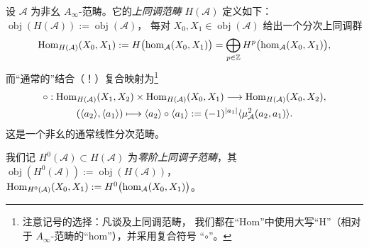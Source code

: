 \begin{Def}\label{def:2.6}
设 $\mathcal A$ 为非幺 $A_\infty$-范畴。它的\emph{上同调范畴} $H(\mathcal A)$
定义如下：$\operatorname{obj}(H(\mathcal A)):=\operatorname{obj}(\mathcal A)$，
每对 $X_0,X_1\in\operatorname{obj}(\mathcal A)$ 给出一个分次上同调群
\begin{equation}\label{eq:2.7}
  \operatorname{Hom}_{H(\mathcal A)}(X_0,X_1):=H\bigl(\hom_{\mathcal A}(X_0,X_1)\bigr)
  =\bigoplus_{p\in\mathbb Z}H^p\bigl(\hom_{\mathcal A}(X_0,X_1)\bigr),
\end{equation}
而“通常的”结合（！）复合映射为\footnote{注意记号的选择：凡谈及上同调范畴，
我们都在“Hom”中使用大写“H”（相对于 $A_\infty$-范畴的“hom”），并采用复合符号
“$\circ$”。}
\begin{equation}\label{eq:2.8}
  \begin{gathered}
    \circ:\operatorname{Hom}_{H(\mathcal A)}(X_1,X_2)\times\operatorname{Hom}_{H(\mathcal A)}(X_0,X_1)
    \longrightarrow\operatorname{Hom}_{H(\mathcal A)}(X_0,X_2),\\
    (\langle a_2\rangle,\langle a_1\rangle)\longmapsto
    \langle a_2\rangle\circ\langle a_1\rangle
    :=(-1)^{|a_1|}\langle\mu^2_{\mathcal A}(a_2,a_1)\rangle.
  \end{gathered}
\end{equation}
这是一个非幺的通常线性分次范畴。
\end{Def}

我们记 $H^0(\mathcal A)\subset H(\mathcal A)$ 为\emph{零阶上同调子范畴}，其
$\operatorname{obj}(H^0(\mathcal A)):=\operatorname{obj}(H(\mathcal A))$，
$\operatorname{Hom}_{H^0(\mathcal A)}(X_0,X_1):=H^0\bigl(\hom_{\mathcal A}(X_0,X_1)\bigr)$。

